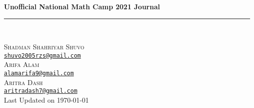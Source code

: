 \begin{titlepage}
\vspace*{3cm}



\begin{center}
\huge \sffamily\bfseries Unofficial National Math Camp 2021 Journal
\end{center}

\rule{\linewidth}{1mm} \\[2.5cm]

\begin{center}


\textsc{\LARGE Shadman Shahriyar Shuvo}\\[0.3cm]
\href{mailto:shuvo2005rzs@gmail.com}{\texttt{shuvo2005rzs@gmail.com}}\\[1cm]

\textsc{\LARGE Arifa Alam}\\[0.3cm]
\href{mailto:alamarifa9@gmail.com}{\texttt{alamarifa9@gmail.com}}\\[1cm]


\textsc{\LARGE Aritra Dash}\\[0.3cm]
\href{mailto:aritradash7@gmail.com}{\texttt{aritradash7@gmail.com}}\\[2cm]


{\sffamily Last Updated on \today}
\end{center}
\end{titlepage}


